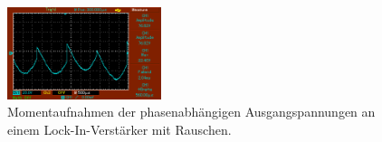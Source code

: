 \begin{figure}
\begin{minipage}{0.5\textwidth}
        \caption{$\phi = \SI{300}{\degree}$.} 
        \label{fig:26}
    \end{minipage}
    \vspace{1cm}
    \vfill
        \centering
        \includegraphics[width=0.4\textwidth]{bilder/360mit.png}
        \caption{$\phi = \SI{360}{\degree}$.} 
        \label{fig:27}
    \caption{Momentaufnahmen der phasenabhängigen Ausgangspannungen an einem Lock-In-Verstärker mit Rauschen.}
\end{figure}